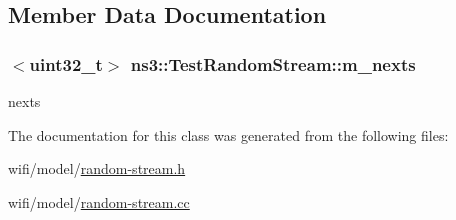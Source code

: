 \subsection{Member Data Documentation}
\subsubsection[{\texorpdfstring{m\+\_\+nexts}{m_nexts}}]{$<$uint32\+\_\+t$>$ ns3\+::\+Test\+Random\+Stream\+::m\+\_\+nexts\hspace{0.3cm}{\ttfamily [private]}}\hypertarget{classns3_1_1TestRandomStream_a90c05d109ad34de296bff0662bfd75fe}{}\label{classns3_1_1TestRandomStream_a90c05d109ad34de296bff0662bfd75fe}


nexts 



The documentation for this class was generated from the following files\+:\begin{DoxyCompactItemize}
\item 
wifi/model/\hyperlink{random-stream_8h}{random-\/stream.\+h}\item 
wifi/model/\hyperlink{random-stream_8cc}{random-\/stream.\+cc}\end{DoxyCompactItemize}
